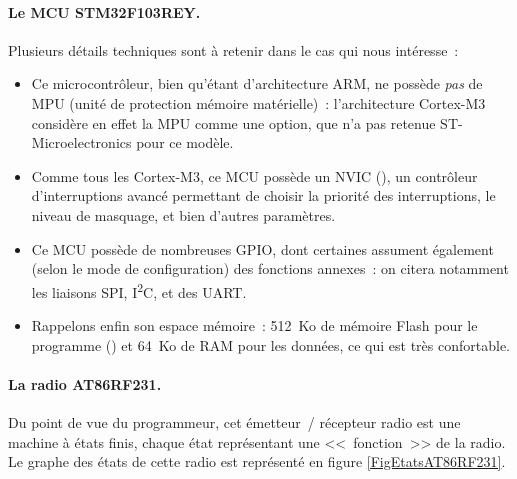 \paragraph{Le MCU STM32F103REY.}

Plusieurs détails techniques sont à retenir dans le cas qui nous intéresse~:
\begin{itemize}
\item Ce microcontrôleur, bien qu'étant d'architecture ARM, ne possède
\emph{pas} de MPU (unité de protection mémoire matérielle)~: l'architecture
Cortex-M3 considère en effet la MPU comme une option, que n'a pas retenue
ST-Micro\-electronics pour ce modèle.
\item Comme tous les Cortex-M3, ce MCU possède un NVIC (), un contrôleur d'interruptions avancé
permettant de choisir la priorité des interruptions, le niveau de
masquage, et bien d'autres paramètres.
\item Ce MCU possède de nombreuses GPIO, dont certaines assument également
(selon le mode de configuration) des fonctions annexes~: on citera
notamment les liaisons SPI, I\textsuperscript{2}C, et des UART.
\item Rappelons enfin son espace mémoire~: 512~Ko de mémoire Flash pour
le programme () et 64~Ko de RAM pour les données, ce
qui est très confortable.
\end{itemize}

\paragraph{La radio AT86RF231.}

Du point de vue du programmeur, cet émetteur~/ récepteur radio est une
machine à états finis, chaque état représentant une <<~fonction~>> de
la radio. Le graphe des états de cette radio est représenté en figure
\vref{FigEtatsAT86RF231}.

